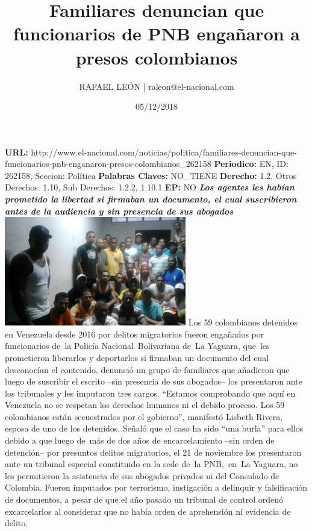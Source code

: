 \documentclass{article}%
\title{\textbf{Familiares denuncian que funcionarios de PNB engañaron a presos colombianos}}%
\author{RAFAEL LEÓN | raleon@el{-}nacional.com}%
\date{05/12/2018}%
\begin{document}
%
\normalsize%
\maketitle%
\textbf{URL: }%
http://www.el{-}nacional.com/noticias/politica/familiares{-}denuncian{-}que{-}funcionarios{-}pnb{-}enganaron{-}presos{-}colombianos\_262158\newline%
%
\textbf{Periodico: }%
EN, %
ID: %
262158, %
Seccion: %
Política\newline%
%
\textbf{Palabras Claves: }%
NO\_TIENE\newline%
%
\textbf{Derecho: }%
1.2, %
Otros Derechos: %
1.10, %
Sub Derechos: %
1.2.2, 1.10.1\newline%
%
\textbf{EP: }%
NO\newline%
\newline%
%
\textbf{\textit{Los agentes les habían prometido la libertad si firmaban un documento, el cual suscribieron antes de la audiencia y sin presencia de sus abogados}}%
\newline%
\newline%
%
\includegraphics[width=300px]{217.jpg}%
\newline%
%
Los 59 colombianos detenidos en Venezuela desde 2016 por delitos migratorios fueron engañados por funcionarios de~la Policía Nacional~Bolivariana de~La Yaguara, que~les prometieron liberarlos y deportarlos si firmaban un documento del cual desconocían el contenido, denunció un grupo de familiares que añadieron que luego de suscribir el escrito –sin presencia de sus abogados– los presentaron ante los tribunales y les imputaron tres cargos.%
\newline%
%
“Estamos comprobando que aquí en Venezuela no se respetan los derechos humanos ni el debido proceso. Los 59 colombianos están secuestrados por el gobierno”, manifestó Lisbeth Rivera, esposa de uno de los detenidos.%
\newline%
%
Señaló que el caso ha sido “una burla” para ellos debido a que luego de~más de dos años de encarcelamiento –sin orden de detención– por presuntos delitos migratorios, el 21 de noviembre los presentaron ante un tribunal especial constituido en la sede de~la PNB,~en~La Yaguara, no les permitieron la asistencia de sus abogados privados ni del Consulado de Colombia. Fueron imputados por terrorismo, instigación a delinquir y falsificación de documentos, a pesar de que el año pasado un tribunal de control ordenó excarcelarlos al considerar que no había orden de aprehensión ni evidencia de delito.%
\end{document}
